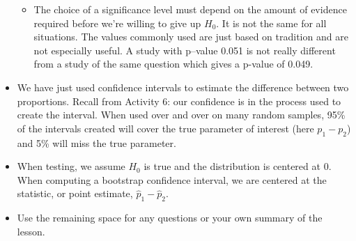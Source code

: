 \begin{itemize}
\begin{itemize}
    \item The choice of a significance level must depend on the amount
      of evidence required before we're willing to give up $H_0$.  It
      is not the same for all situations.  The values commonly used are
      just based on tradition and are not especially useful.  
      A study with p--value 0.051 is not really different from a study
      of the same question which gives a p-value of 0.049.
      
    \end{itemize}
  \item We have just used confidence intervals 
    to estimate the difference between two proportions.  Recall from
    Activity 6: our confidence is in the process used to create the
    interval.  When used over and over on many random samples, 95\% of
    the intervals created will cover the true parameter of interest
    (here $p_1 - p_2$) and 5\% will miss the true parameter.

  \item When testing, we assume $H_0$ is true and the distribution is
    centered at 0.  When computing a bootstrap confidence interval, we
    are centered at the statistic, or point estimate, $\widehat{p}_1 -
    \widehat{p}_2$. 
 \item 
  Use the remaining space for any questions or your own summary of the
  lesson. 

  \end{itemize}



